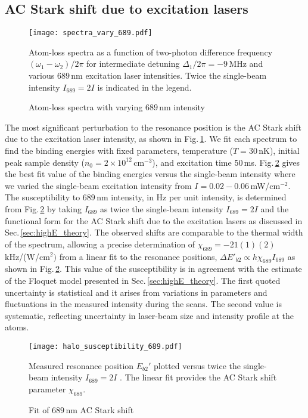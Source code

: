 \subsection{AC Stark shift due to excitation lasers}
	\begin{figure} 
	\centerline{
	  \texttt{[image: spectra\_vary\_689.pdf]}}
	  \caption{Atom-loss spectra with varying $689$\,nm intensity}{Atom-loss spectra as a function of two-photon difference frequency $(\omega_1-\omega_2)/2\pi$ for intermediate detuning $\Delta_1/2\pi=-9$\,MHz and various $689$\,nm excitation laser intensities. Twice the single-beam intensity $I_{689}=2I$ is indicated in the legend.}
	  \label{fig:SpectraVarying689Intensity}
	\end{figure}
The most significant perturbation to the resonance position is the AC Stark shift due to the excitation laser intensity, as shown in Fig.\,\ref{fig:SpectraVarying689Intensity}.
We fit each spectrum to find the binding energies with fixed parameters, temperature ($T=30$\,nK), initial peak sample density ($n_0=2\times 10^{12}$\,cm$^{-3}$), and excitation time 50\,ms.
Fig.\,\ref{fig:ShiftWith689Intensity} gives the best fit value of the binding energies versus the single-beam intensity where we varied the single-beam excitation intensity from $I=0.02-0.06$\,mW/cm$^{-2}$.
The susceptibility to $689$\,nm intensity, in Hz per unit intensity, is determined from Fig.\,\ref{fig:ShiftWith689Intensity} by taking $I_{689}$ as twice the single-beam intensity $I_{689}=2I$ and the functional form for the AC Stark shift due to the excitation lasers as discussed in Sec.\,\ref{sec:highE_theory}.
The observed shifts are comparable to the thermal width of the spectrum, allowing a precise determination of $\chi_{689}=-21(1)(2)$\,kHz/(W/cm$^{2})$ from a linear fit to the resonance positions, $\Delta E'_{b2}\propto h\chi_{689} I_{689}$ as shown in Fig.\,\ref{fig:ShiftWith689Intensity}.
This value of the susceptibility is in agreement with the estimate of the Floquet model presented in Sec.\,\ref{sec:highE_theory}.
The first quoted uncertainty is statistical and it arises from variations in parameters and fluctuations in the measured intensity during the scans.
The second value is systematic, reflecting uncertainty in laser-beam size and intensity profile at the atoms.
	\begin{figure}
	\centerline{
	  \texttt{[image: halo\_susceptibility\_689.pdf]}}
	  \caption{Fit of $689$\,nm AC Stark shift}{Measured resonance position $E_{b2}'$ plotted versus twice the single-beam intensity $I_{689}=2I$ . The linear fit provides the AC Stark shift parameter $\chi_{689}$.}
	  \label{fig:ShiftWith689Intensity}
	\end{figure}


